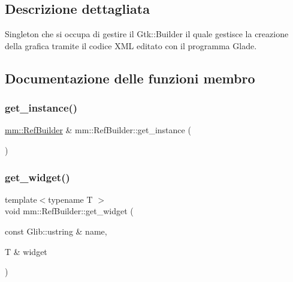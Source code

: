\subsection{Descrizione dettagliata}
Singleton che si occupa di gestire il Gtk\+::\+Builder il quale gestisce la creazione della grafica tramite il codice X\+ML editato con il programma Glade. 

\subsection{Documentazione delle funzioni membro}
\mbox{\label{classmm_1_1_ref_builder_a1c46de2b1ff68aebfc85692a99827753}} 
\subsubsection{\texorpdfstring{get\+\_\+instance()}{get\_instance()}}
{\footnotesize\ttfamily \mbox{\hyperlink{classmm_1_1_ref_builder}{mm\+::\+Ref\+Builder}} \& mm\+::\+Ref\+Builder\+::get\+\_\+instance (\begin{DoxyParamCaption}{ }\end{DoxyParamCaption})\hspace{0.3cm}{\ttfamily [static]}}

\mbox{\label{classmm_1_1_ref_builder_a67812973516cbeddf488360424685153}} 
\subsubsection{\texorpdfstring{get\+\_\+widget()}{get\_widget()}}
{\footnotesize\ttfamily template$<$typename T $>$ \\
void mm\+::\+Ref\+Builder\+::get\+\_\+widget (\begin{DoxyParamCaption}\item[{const Glib\+::ustring \&}]{name,  }\item[{T \&}]{widget }\end{DoxyParamCaption})\hspace{0.3cm}{\ttfamily [inline]}}

